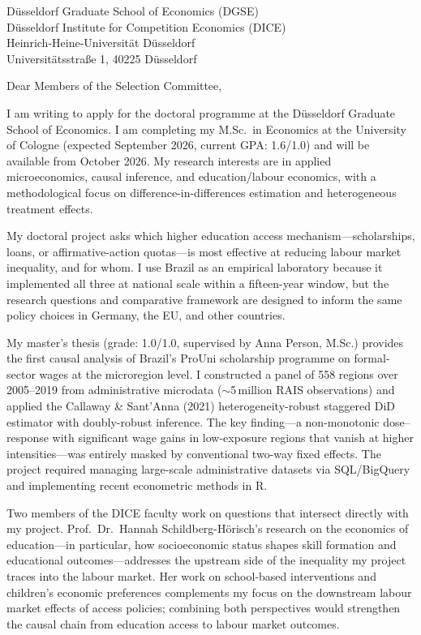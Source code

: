 \documentclass[a4paper,11pt]{letter}
\begin{document}
\begin{letter}{%
    D\"usseldorf Graduate School of Economics (DGSE) \\
    D\"usseldorf Institute for Competition Economics (DICE) \\
    Heinrich-Heine-Universit\"at D\"usseldorf \\
    Universit\"atsstra\ss e 1, 40225 D\"usseldorf
}

\opening{Dear Members of the Selection Committee,}

I am writing to apply for the doctoral programme at the D\"usseldorf Graduate School of Economics. I am completing my M.Sc.\ in Economics at the University of Cologne (expected September 2026, current GPA: 1.6/1.0) and will be available from October 2026. My research interests are in applied microeconomics, causal inference, and education/labour economics, with a methodological focus on difference-in-differences estimation and heterogeneous treatment effects.

My doctoral project asks which higher education access mechanism---scholarships, loans, or affirmative-action quotas---is most effective at reducing labour market inequality, and for whom. I use Brazil as an empirical laboratory because it implemented all three at national scale within a fifteen-year window, but the research questions and comparative framework are designed to inform the same policy choices in Germany, the EU, and other countries.

My master's thesis (grade: 1.0/1.0, supervised by Anna Person, M.Sc.) provides the first causal analysis of Brazil's ProUni scholarship programme on formal-sector wages at the microregion level. I constructed a panel of 558 regions over 2005--2019 from administrative microdata ($\sim$5\,million RAIS observations) and applied the Callaway \& Sant'Anna (2021) heterogeneity-robust staggered DiD estimator with doubly-robust inference. The key finding---a non-monotonic dose--response with significant wage gains in low-exposure regions that vanish at higher intensities---was entirely masked by conventional two-way fixed effects. The project required managing large-scale administrative datasets via SQL/BigQuery and implementing recent econometric methods in R.

Two members of the DICE faculty work on questions that intersect directly with my project. Prof.\ Dr.\ Hannah Schildberg-H\"orisch's research on the economics of education---in particular, how socioeconomic status shapes skill formation and educational outcomes---addresses the upstream side of the inequality my project traces into the labour market. Her work on school-based interventions and children's economic preferences complements my focus on the downstream labour market effects of access policies; combining both perspectives would strengthen the causal chain from education access to labour market outcomes.


\end{letter}
\end{document}
